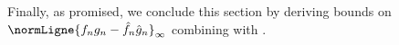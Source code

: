 \documentclass[11pt,a4paper]{article}
\begin{document}


Finally, as promised, we conclude this section by deriving bounds on
$\normLigne{f_n g_n  - \hat{f}_n\hat{g}_n}_\infty$ combining
 with .
\end{document}
